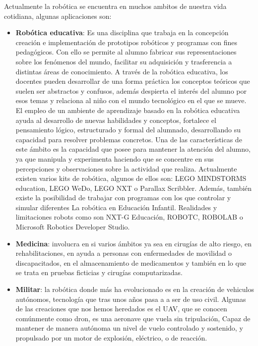Actualmente la robótica se encuentra en muchos ambitos de nuestra vida cotidiana, algunas aplicaciones son:
\begin{itemize}
\item \textbf{Robótica educativa}: Es una disciplina que trabaja en la concepción creación e implementación de prototipos robóticos y programas con fines pedagógicos. Con ello se permite al alumno fabricar sus representaciones sobre los fenómenos del mundo, facilitar su adquisición y trasferencia a distintas áreas de conocimiento.
A través de la robótica educativa, los docentes pueden desarrollar de una forma práctica los conceptos teóricos que suelen ser abstractos y confusos, además despierta el interés del alumno por esos temas y relaciona al niño con el mundo tecnológico en el que se mueve. El empleo de un ambiente de aprendizaje basado en la robótica educativa ayuda al desarrollo de nuevas habilidades y conceptos, fortalece el pensamiento lógico, estructurado y formal del alumnado, desarrollando su capacidad para resolver problemas concretos.
Una de las características de este ámbito es la capacidad que posee para mantener la
atención del alumno, ya que manipula y experimenta haciendo que se concentre en sus
percepciones y observaciones sobre la actividad que realiza. Actualmente existen varios kits de robótica, algunos de ellos son: LEGO MINDSTORMS education, LEGO WeDo, LEGO NXT o Parallax Scribbler. Además, también existe la posibilidad de trabajar con programas con los que controlar y simular diferentes La robótica en Educación Infantil. Realidades y limitaciones robots como son NXT-G Educación, ROBOTC, ROBOLAB o Microsoft Robotics Developer Studio.

\item \textbf{Medicina}: involucra en si varios ámbitos ya sea en cirugías de alto riesgo, en rehabilitaciones, en ayuda a personas con enfermedades de movilidad o discapacitados, en el almacenamiento de medicamentos y también en lo que se trata en pruebas ficticias y cirugías computarizadas.

\item \textbf{Militar}: la robótica donde más ha evolucionado es en la creación de vehiculos autónomos, tecnología que tras unos años pasa a a ser de uso civil.
Algunas de las creaciones que nos hemos heredados es el UAV, que se conocen comúnmente como dron, es una aeronave que vuela sin tripulación, Capaz de mantener de manera autónoma un nivel de vuelo controlado y sostenido, y propulsado por un motor de explosión, eléctrico, o de reacción.


\end{itemize}

